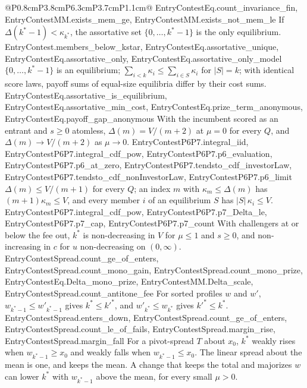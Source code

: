 \begin{longtable}{@{}P{0.8cm}P{3.8cm}P{6.3cm}P{3.7cm}P{1.1cm}@{}}
  {EntryContestEq.count_invariance_fin, EntryContestMM.exists_mem_ge, EntryContestMM.exists_not_mem_le}
  {If $\Delta(k^*-1)<\kappa_{k^*}$, the assortative set $\{0,\dots,k^*-1\}$ is the
  only equilibrium.}
  {EntryContest.members_below_kstar, EntryContestEq.assortative_unique, EntryContestEq.assortative_only, EntryContestEq.assortative_only_model}
  {$\{0,\dots,k^*-1\}$ is an equilibrium; $\sum_{i<k}\kappa_i\le\sum_{i\in S}\kappa_i$
  for $|S|=k$; with identical score laws, payoff sums of equal-size equilibria
  differ by their cost sums.}
  {EntryContestEq.assortative_is_equilibrium, EntryContestEq.assortative_min_cost, EntryContestEq.prize_term_anonymous, EntryContestEq.payoff_gap_anonymous}
  {With the incumbent scored as an entrant and $s\ge0$ atomless, $\Delta(m)=V/(m+2)$ at $\mu=0$
  for every $Q$, and $\Delta(m)\to V/(m+2)$ as $\mu\to0$.}
  {EntryContestP6P7.integral_iid, EntryContestP6P7.integral_cdf_pow, EntryContestP6P7.p6_evaluation, EntryContestP6P7.p6_at_zero, EntryContestP6P7.tendsto_cdf_investorLaw, EntryContestP6P7.tendsto_cdf_nonInvestorLaw, EntryContestP6P7.p6_limit}
  {$\Delta(m)\le V/(m+1)$ for every $Q$; an index $m$ with $\kappa_m\le\Delta(m)$
  has $(m+1)\kappa_m\le V$, and every member $i$ of an equilibrium $S$ has
  $|S|\,\kappa_i\le V$.}
  {EntryContestP6P7.integral_cdf_pow, EntryContestP6P7.p7_Delta_le, EntryContestP6P7.p7_cap, EntryContestP6P7.p7_count}
  {With challengers at or below the fee out, $k^*$ is non-decreasing in $V$ for
  $\mu\le1$ and $s\ge0$, and non-increasing in $c$ for $u$ non-decreasing on
  $(0,\infty)$.}
  {EntryContestSpread.count_ge_of_enters, EntryContestSpread.count_mono_gain, EntryContestSpread.count_mono_prize, EntryContestEq.Delta_mono_prize, EntryContestMM.Delta_scale, EntryContestSpread.count_antitone_fee}
  {For sorted profiles $w$ and $w'$, $w_{k^*-1}\le w'_{k^*-1}$ gives $k^*\le k'^*$, and
  $w'_{k^*}\le w_{k^*}$ gives $k'^*\le k^*$.}
  {EntryContestSpread.enters_down, EntryContestSpread.count_ge_of_enters, EntryContestSpread.count_le_of_fails, EntryContestSpread.margin_rise, EntryContestSpread.margin_fall}
  {For a pivot-spread $T$ about $x_0$, $k^*$ weakly rises when $w_{k^*-1}\ge x_0$ and
  weakly falls when $w_{k^*-1}\le x_0$. The linear spread about the mean is one,
  and keeps the mean. A change that keeps the total and majorizes $w$ can lower
  $k^*$ with $w_{k^*-1}$ above the mean, for every small $\mu>0$.}

\end{longtable}
